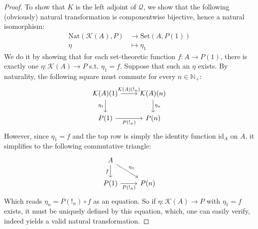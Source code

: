 \documentclass{article}
\theoremstyle{remark}
\theoremstyle{definition}
\newcommand{\N}{\mathbb N}
\newcommand{\Set}{\mathrm{Set}}
\newcommand{\id}{\mathrm{id}}
\newcommand{\K}{\mathcal K}
\newcommand{\Q}{\mathcal Q}
\newcommand{\Nat}{\mathrm{Nat}}
\begin{document}
	\begin{proof}
		To show that $K$ is the left adjoint of $\Q$, we show that the following (obviously) natural transformation is componentwise bijective, hence a natural isomorphism:
		\begin{align*}
			\Nat(\K(A), P)&\to\Set(A, P(1))\\
			\eta&\mapsto\eta_1
		\end{align*}
		We do it by showing that for each set-theoretic function $f:A\to P(1)$, there is exactly one $\eta:\K(A)\to P$ s.t. $\eta_1=f$.
		Suppose that such an $\eta$ exists. By naturality, the following square must commute for every $n\in\N_+$:
		\[\begin{tikzcd}
			\K(A)(1)\arrow{r}{\K(A)(!_n)}\arrow{d}[swap]{\eta_1}&\K(A)(n)\arrow{d}{\eta_n}\\
			P(1)\arrow{r}[swap]{P(!_n)}&P(n)
		\end{tikzcd}\]
		However, since $\eta_1=f$ and the top row is simply the identity function $\id_A$ on $A$, it simplifies to the following commutative triangle:
		\[\begin{tikzcd}
			A\arrow{d}[swap]{f}\arrow{dr}{\eta_n}\\
			P(1)\arrow{r}[swap]{P(!_n)}&P(n)
		\end{tikzcd}\]
		Which reads $\eta_n=P(!_n)\circ f$ as an equation. So if $\eta:\K(A)\to P$ with $\eta_1=f$ exists, it must be uniquely defined by this equation, which, one can easily verify, indeed yields a valid natural transformation.
		

\end{proof}
\end{document}
